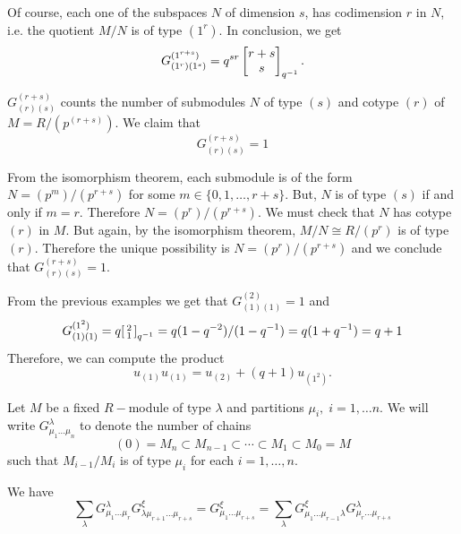        Of course, each one of the subspaces $N$ of dimension $s$, has codimension $r$ in $N$, i.e. the quotient $M/N$ is of type $(1^r)$. In conclusion, we get
       \begin{equation}
           G_{(1^r)(1^s)}^{(1^{r+s})}=q^{sr}\begin{bmatrix} r+s\\s\end{bmatrix}_{q^{-1}}.
       \end{equation}
\begin{dang}
    \begin{example}
    $G_{(r)(s)}^{(r+s)}$ counts the number of submodules $N$ of type $(s)$ and cotype $(r)$ of $M=R/(p^{(r+s)})$. We claim that 
    \begin{equation}
        G_{(r)(s)}^{(r+s)}=1
    \end{equation}
    \end{example}
\end{dang}
From the isomorphism theorem, each submodule is of the form $N=(p^m)/(p^{r+s})$ for some $m\in\{0,1,\dots,r+s\}$. But, $N$ is of type $(s)$ if and only if $m=r$. Therefore $N=(p^r)/(p^{r+s})$. We must check that $N$ has cotype $(r)$ in $M$. But again, by the isomorphism theorem, $M/N\cong R/(p^{r})$ is of type $(r)$. Therefore the unique possibility is $N=(p^r)/(p^{r+s})$ and we conclude that $G_{(r)(s)}^{(r+s)}=1$.\par
 From the previous examples we get that $G_{(1)(1)}^{(2)}=1$ and 
 \begin{equation}
     G_{(1)(1)}^{(1^2)}=q\begin{bsmallmatrix} 2\\1\end{bsmallmatrix}_{q^{-1}}=q(1-q^{-2})/(1-q^{-1})=q(1+q^{-1})=q+1
 \end{equation}
 Therefore, we can compute the product
        \begin{equation}
            u_{(1)}u_{(1)}=u_{(2)}+(q+1)u_{(1^2)}.
        \end{equation}
\begin{dang}
    \begin{definition}\cite{macdonald1998symmetric}
        Let $M$ be a fixed $R-$module of type $\lambda$ and partitions $\mu_i,\;i=1,\dots n$. We will write $G_{\mu_1\dots\mu_n}^\lambda$ to denote the number of chains
        \begin{equation}
            (0)=M_n\subset M_{n-1}\subset \cdots\subset M_1\subset M_0=M
        \end{equation}
        such that $M_{i-1}/M_{i}$ is of type $\mu_i$ for each $i=1,\dots,n$.
    \end{definition}
\end{dang}
\begin{dang}
    \begin{lemma}\label{expression_for_the_associativity_of_hall_algebra}
        We have
        \begin{equation}
            \sum_{\lambda}G_{\mu_1\dots\mu_r}^\lambda G_{\lambda\mu_{r+1}\dots\mu_{r+s}}^\xi=G_{\mu_1\dots\mu_{r+s}}^\xi= \sum_{\lambda}G_{\mu_1\dots\mu_{r-1}\lambda}^{\xi} G_{\mu_{r}\dots\mu_{r+s}}^\lambda
        \end{equation}
    \end{lemma}
\end{dang}
